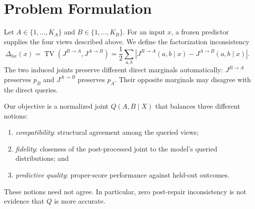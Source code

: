 \documentclass[a4paper,fleqn]{cas-sc}
\newcommand{\TV}{\operatorname{TV}}
\newcommand{\Jone}{J^{B\rightarrow A}}
\newcommand{\Jtwo}{J^{A\rightarrow B}}
\begin{document}
\begin{table}
\centering
\caption{Relation to adjacent methods. ``Outcome-gated'' means that held-out labels may determine whether a transformation is applied. These categories summarize typical uses and are not claims that every published variant has identical properties.}
\label{tab:positioning}
\end{table}

\section{Problem Formulation}
Let $A\in\{1,\ldots,K_A\}$ and $B\in\{1,\ldots,K_B\}$. For an input $x$, a frozen predictor supplies the four views described above. We define the factorization inconsistency
\begin{equation}
\Delta_{\mathrm{fac}}(x)=\TV\!\left(\Jone,\Jtwo\right)
=\frac{1}{2}\sum_{a,b}\left|\Jone(a,b\mid x)-\Jtwo(a,b\mid x)\right|.
\end{equation}
The two induced joints preserve different direct marginals automatically: $\Jone$ preserves $p_B$ and $\Jtwo$ preserves $p_A$. Their opposite marginals may disagree with the direct queries.

Our objective is a normalized joint $Q(A,B\mid X)$ that balances three different notions:
\begin{enumerate}
\item \emph{compatibility}: structural agreement among the queried views;
\item \emph{fidelity}: closeness of the post-processed joint to the model's queried distributions; and
\item \emph{predictive quality}: proper-score performance against held-out outcomes.
\end{enumerate}
These notions need not agree. In particular, zero post-repair inconsistency is not evidence that $Q$ is more accurate.
\end{document}
